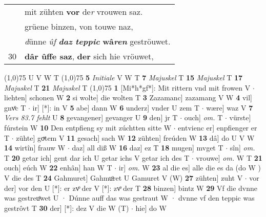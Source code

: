 \documentclass[8pt,a4paper,notitlepage]{article}
\begin{document}
\begin{table}[ht]
\begin{minipage}[t]{0.5\linewidth}
\begin{tabular}{rl}
 & mit zühten \textbf{vor} de\textit{r} vrouwen saz.\\ 
 & grüene binzen, von touwe naz,\\ 
 & \textit{d}ünne \textit{ûf} \textbf{\textit{daz} \textit{teppic}} \textbf{wâ\textit{ren}} geströuwet.\\ 
30 & \textbf{dâr ûffe saz}, \textbf{der} sich hie vröuwet,\\ 
\end{tabular}
\scriptsize
\line(1,0){75} \newline
U V W T \newline
\line(1,0){75} \newline
\textbf{5} \textit{Initiale} V W T  \textbf{7} \textit{Majuskel} T  \textbf{15} \textit{Majuskel} T  \textbf{17} \textit{Majuskel} T  \textbf{21} \textit{Majuskel} T  \newline
\line(1,0){75} \newline
\textbf{1} [Mi*h*gf*]: Mit rittern vnd mit frowen V  $\cdot$ liehten] schonen W \textbf{2} si wolte] die wolten T \textbf{3} Zazamanc] zazamang V W \textbf{4} vil] gnvͦc T  $\cdot$ ir] [*]: in V \textbf{5} abe] dann W \textbf{6} underz] vnder U zem T  $\cdot$ wære] waz V \textbf{7} \textit{Vers 83.7 fehlt} U  \textbf{8} gevangener] gevanger U \textbf{9} den] jr T  $\cdot$ ouch] \textit{om.} T  $\cdot$ vürste] fúrstein W \textbf{10} Den entpfieng sy mit zúchtten sitte W  $\cdot$ entvienc er] enpfienger er T  $\cdot$ zühte] goͮtem V \textbf{11} gesach] sach W \textbf{12} zühten] freúden W \textbf{13} dâ] do U V W \textbf{14} wirtîn] frauw W  $\cdot$ daz] all diß W \textbf{16} daz] ez T \textbf{18} mugen] mvget T  $\cdot$ sîn] \textit{om.} T \textbf{20} getar ich] gent dar ich U getar ichs V getar ich des T  $\cdot$ vrouwe] \textit{om.} W T \textbf{21} ouch] eúch W \textbf{22} enhân] han W T  $\cdot$ ir] \textit{om.} W \textbf{23} al die es] alle die es da (do W ) V die des T \textbf{24} Gahmuret] Gahmuͦret U Gamuret V (W) \textbf{27} zühten] zuht V  $\cdot$ vor der] vor den U [*]: er zvͦ der V [*]: zvͦ der T \textbf{28} binzen] bintz W \textbf{29} Vf die dvnne was gestreuͦwet U · Dúnne auff das was gestraut W · dvnne vf den teppic was gestrôvt T \textbf{30} der] [*]: dez V die W (T)  $\cdot$ hie] do W \newline
\end{minipage}
\end{table}
\end{document}
